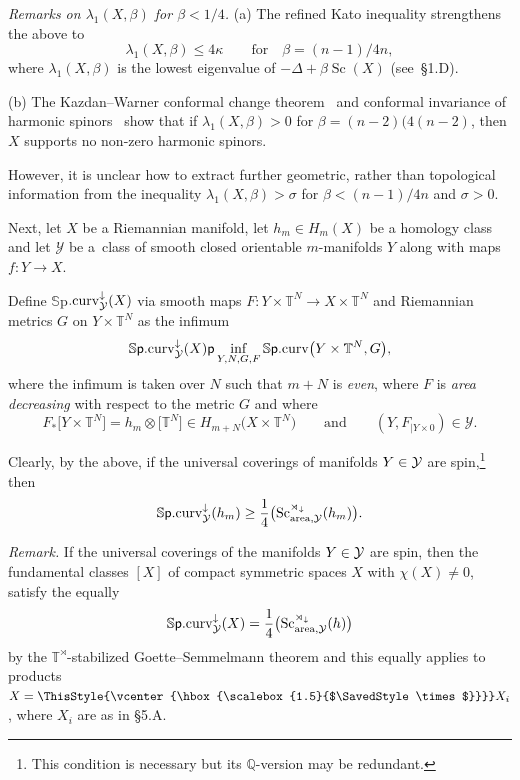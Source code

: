 \documentclass[pdftex]{sigma}
\numberwithin{equation}{section}
\newcommand\bigtimes{\mathbin{\ThisStyle{\vcenter{\hbox{%
\scalebox{1.5}{$\SavedStyle\times$}}}}}}
\begin{document}
{\it Remarks on $\lambda_1(X, \beta)$ for $\beta<1/4$.} (a) The refined Kato inequality strengthens the above to
\[
\lambda_1(X,\beta)\leq 4\kappa \qquad \text{for}\quad \beta= (n-1)/4n,
\]
where $\lambda_1(X,\beta)$ is the lowest eigenvalue of $-\Delta+\beta \operatorname{Sc}(X)$ (see~\S1.D).

(b) The Kazdan--Warner conformal change theorem~\cite{KW1975}
and conformal invariance of harmonic spinors~\cite{Hi1974} show that
 if $\lambda_1(X,\beta)>0$ for $\beta=(n-2)(4(n-2)$, then
$X$ supports no non-zero harmonic spinors.

However, it is unclear how to extract further geometric, rather than topological information from
 the inequality $\lambda_1(X,\beta)> \sigma $ for $\beta < (n-1)/4n$ and
 $\sigma>0$.

Next, let $X$ be a Riemannian manifold, let $h_m\in H_m(X)$
be a homology class and let $\mathcal Y $ be a~class of smooth closed orientable $m$-manifolds $Y$ along with maps
$f\colon Y\to X$.

 Define $ \mathbb S${\sf p}$.{\rm curv}^\downarrow _{\mathcal Y}(X)$ via smooth maps
$F \colon Y\times \mathbb T^N\to X\times \mathbb T^N$ and Riemannian metrics $G$ on $Y\times \mathbb T^N$ as the infimum
\[
\mathbb S\mbox{\sf p}.{\rm curv}^\downarrow _{\mathcal Y}(X)\mbox{\sf p}\inf_{ Y,N,G,F} \mathbb S\mbox{\sf p}.{\rm curv} \bigl(Y\times \mathbb T^N,G\bigr),
\]
where the infimum is taken over $N$ such that $m+N$ is {\it even}, where $F$ is {\it area decreasing} with respect to the metric $G$ and where
\[
F_\ast\bigl[Y\times\mathbb T^N\bigr]=h_m\otimes \bigl[\mathbb T^N\bigr]\in H_{m+N}\bigl(X\times \mathbb T^N\bigr) \qquad \text{and} \qquad (Y, F_{|Y\times 0})\in \mathcal Y.
\]

 Clearly, by the above,
if the universal coverings of manifolds $Y\in \cal Y$ are spin,\footnote{This condition is necessary but its $\mathbb Q$-version may be redundant.} then
\[
\mathbb S\mbox{\sf p}.{\rm curv}^\downarrow _{\mathcal Y}(h_m)\geq\frac{1}{4} \bigl(\operatorname{Sc}^{\rtimes _\downarrow}_{{\rm area},\mathcal Y }(h_m)\bigr).
\]

{\it Remark.} If the universal coverings of the manifolds $Y\in \cal Y$ are spin, then the fundamental classes $[X]$ of compact symmetric spaces $X$ with $\chi(X)\neq 0$, satisfy the equally
\[
\mathbb S\mbox{\sf p}.{\rm curv}^\downarrow _{\mathcal Y}(X)=\frac{1}{4} \bigl(\operatorname{Sc}^{\rtimes _\downarrow}_{{\rm area},\mathcal Y }(h)\bigr)
\]
 by the $\mathbb T^\rtimes$-stabilized Goette--Semmelmann theorem and this equally applies to products $X=\bigtimes X_i$, where $X_i$ are as in \S5.A.
\end{document}
